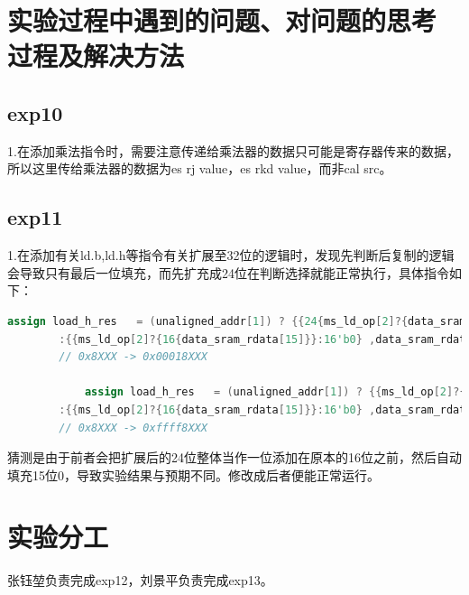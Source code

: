 \documentclass[12pt,a4paper]{article}
\newcommand*{\song}{\CJKfamily{zhsong}}
\newcommand{\sectionfont}{\song\textbf}
\begin{document}
\section{\sectionfont 实验过程中遇到的问题、对问题的思考过程及解决方法}
    \subsection{exp10}
        1.在添加乘法指令时，需要注意传递给乘法器的数据只可能是寄存器传来的数据，所以这里传给乘法器的数据为es rj value，es rkd value，而非cal src。
    \subsection{exp11}
        1.在添加有关ld.b,ld.h等指令有关扩展至32位的逻辑时，发现先判断后复制的逻辑会导致只有最后一位填充，而先扩充成24位在判断选择就能正常执行，具体指令如下：
        \begin{lstlisting}[language=Verilog]
            assign load_h_res   = (unaligned_addr[1]) ? {{24{ms_ld_op[2]?{data_sram_rdata[31]}:0}} ,data_sram_rdata[31:16]}
        :{{ms_ld_op[2]?{16{data_sram_rdata[15]}}:16'b0} ,data_sram_rdata[15:0]};
        // 0x8XXX -> 0x00018XXX
            
            assign load_h_res   = (unaligned_addr[1]) ? {{ms_ld_op[2]?{16{data_sram_rdata[31]}}:16'b0} ,data_sram_rdata[31:16]}
        :{{ms_ld_op[2]?{16{data_sram_rdata[15]}}:16'b0} ,data_sram_rdata[15:0]};
        // 0x8XXX -> 0xffff8XXX
        \end{lstlisting}
        猜测是由于前者会把扩展后的24位整体当作一位添加在原本的16位之前，然后自动填充15位0，导致实验结果与预期不同。修改成后者便能正常运行。
\section{\sectionfont 实验分工}
    张钰堃负责完成exp12，刘景平负责完成exp13。
\end{document}

